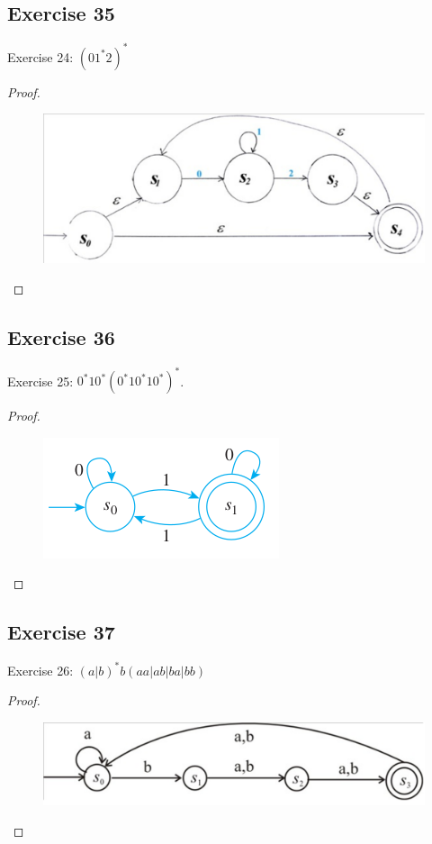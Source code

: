 \documentclass[14pt]{extarticle}
\begin{document}
\subsection{Exercise 35}
Exercise 24: \((01^*2)^*\)
\begin{proof}
    \begin{figure}[ht!]
        \centering
        \includegraphics[scale=0.3]{../images/12.2.35.png}
    \end{figure}
\end{proof}

\subsection{Exercise 36}
Exercise 25: \(0^*10^*(0^*10^*10^*)^*\).
\begin{proof}
    \begin{figure}[ht!]
        \centering
        \includegraphics[scale=0.5]{../images/12.2.36.png}
    \end{figure}
\end{proof}

\subsection{Exercise 37}
Exercise 26: \((a|b)^*b(aa|ab|ba|bb)\)
\begin{proof}
    \begin{figure}[ht!]
        \centering
        \includegraphics[scale=0.3]{../images/12.2.37.png}
    \end{figure}
\end{proof}
\end{document}
